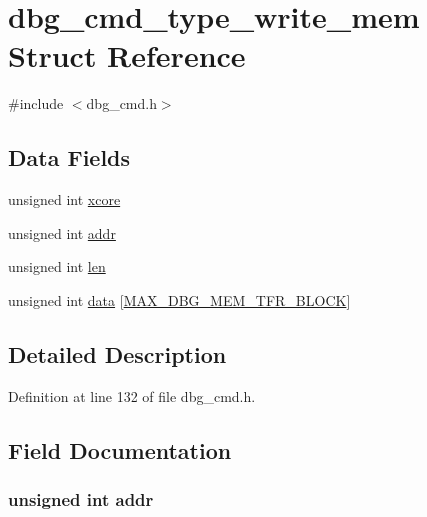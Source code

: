 \hypertarget{structdbg__cmd__type__write__mem}{\section{dbg\-\_\-cmd\-\_\-type\-\_\-write\-\_\-mem Struct Reference}
\label{structdbg__cmd__type__write__mem}
}


{\ttfamily \#include $<$dbg\-\_\-cmd.\-h$>$}

\subsection*{Data Fields}
\begin{DoxyCompactItemize}
\item 
unsigned int \hyperlink{structdbg__cmd__type__write__mem_a78357326dd562d441c3c73f5676ac638}{xcore}
\item 
unsigned int \hyperlink{structdbg__cmd__type__write__mem_ab36863a07751ac73459d46b677c33b57}{addr}
\item 
unsigned int \hyperlink{structdbg__cmd__type__write__mem_a77124bd5f7e31e6fffc19f335da0c23f}{len}
\item 
unsigned int \hyperlink{structdbg__cmd__type__write__mem_ab8207ec1023efdcd4c92b045fd4d2dd0}{data} \mbox{[}\hyperlink{dbg__cmd_8h_ab7ab991376fede9d59ab9bcacd534801}{M\-A\-X\-\_\-\-D\-B\-G\-\_\-\-M\-E\-M\-\_\-\-T\-F\-R\-\_\-\-B\-L\-O\-C\-K}\mbox{]}
\end{DoxyCompactItemize}


\subsection{Detailed Description}


Definition at line 132 of file dbg\-\_\-cmd.\-h.



\subsection{Field Documentation}
\hypertarget{structdbg__cmd__type__write__mem_ab36863a07751ac73459d46b677c33b57}{
\subsubsection[{addr}]{\setlength{\rightskip}{0pt plus 5cm}unsigned int addr}}\label{structdbg__cmd__type__write__mem_ab36863a07751ac73459d46b677c33b57}


